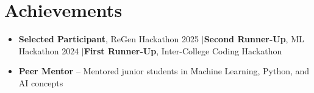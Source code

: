 \documentclass[a4paper,10pt]{article}
\begin{document}
\section{\color{BlueViolet}Achievements}
\begin{itemize}[leftmargin=*, itemsep=0pt, parsep=0pt, topsep=3pt]
  \item\small{\textbf{\color{Blue}Selected Participant}, ReGen Hackathon 2025 \quad$|$\quad \textbf{\color{Blue}Second Runner-Up}, ML Hackathon 2024 \quad$|$\quad \textbf{\color{Blue}First Runner-Up}, Inter-College Coding Hackathon}
  \item\small{\textbf{\color{Blue}Peer Mentor} -- Mentored junior students in Machine Learning, Python, and AI concepts}
\end{itemize}
\end{document}
